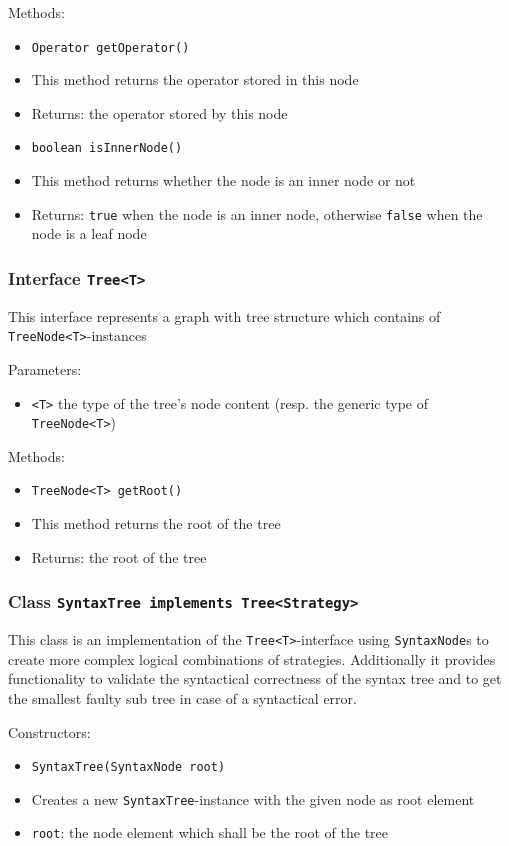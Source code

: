 \documentclass[parskip=full,11pt]{scrartcl}
\begin{document}
Methods:
\begin{itemize} \itemsep -10pt
	\item \texttt{Operator getOperator()}
	\item[] This method returns the operator stored in this node
	\item[] Returns: the operator stored by this node

	\item \texttt{boolean isInnerNode()}
	\item[] This method returns whether the node is an inner node or not
	\item[] Returns: \texttt{true} when the node is an inner node, otherwise  \texttt{false} when the node is a leaf node
\end{itemize}

\subsubsection{Interface \texttt{Tree<T>}}

This interface represents a graph with tree structure which contains of \texttt{TreeNode<T>}-instances

Parameters:
\begin{itemize} \itemsep -10pt
	\item \texttt{<T>} the type of the tree's node content (resp. the generic type of \texttt{TreeNode<T>})
\end{itemize}

Methods:
\begin{itemize}\itemsep -10pt
	\item \texttt{TreeNode<T> getRoot()}
	\item[] This method returns the root of the tree
	\item[] Returns: the root of the tree
\end{itemize}

\subsubsection{Class \texttt{SyntaxTree implements Tree<Strategy>}}

This class is an implementation of the \texttt{Tree<T>}-interface using \texttt{SyntaxNode}s to create more complex logical combinations of strategies. Additionally it provides functionality to validate the syntactical correctness of the syntax tree and to get the smallest faulty sub tree in case of a syntactical error.

Constructors:
\begin{itemize}\itemsep -10pt
	\item \texttt{SyntaxTree(SyntaxNode root)}
	\item[] Creates a new \texttt{SyntaxTree}-instance with the given node as root element
	\item[] \texttt{root}: the node element which shall be the root of the tree
\end{itemize}
\end{document}
